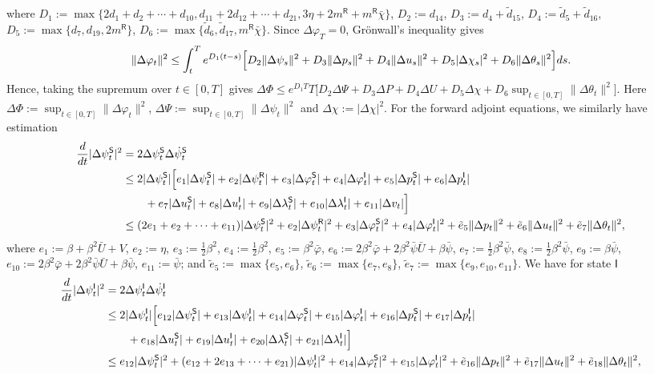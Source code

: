 \documentclass[letterpaper, 10 pt, conference]{ieeeconf}  %
\def\sS{\mathsf{S}}
\def\sI{\mathsf{I}}
\def\sR{\mathsf{R}}
\begin{document}
where $D_1:=\max\big\{
  2d_1 + d_2 + \cdots + d_{10},
  d_{11} + 2d_{12} + \cdots + d_{21},
  3\eta + 2m^{\sR} + m^{\sR}\bar{\chi}\big\}$, $D_2 := d_{14}$, $D_3:= d_4+\tilde{d}_{15}$, $D_4 := \tilde{d}_5+ \tilde{d}_{16}$, $D_5:=\max\{ d_7,d_{19},2m^{\sR}\}$, $D_6 := \max\{ \tilde{d}_6,\tilde{d}_{17},m^{\sR}\bar{\chi}\}$.
Since $\Delta \varphi_T = 0$, Gr\"onwall's inequality gives
$$
\|\Delta \varphi_t\|^2 \le \int_t^T e^{D_1(t-s)}
\Bigl[
D_2\|\Delta \psi_s\|^2 + D_3\|\Delta p_s\|^2 + D_4\|\Delta u_s\|^2 + D_5|\Delta \chi_s|^2 + D_6\|\Delta \theta_s\|^2
\Bigr] ds.
$$
Hence, taking the supremum over $t \in [0,T]$ gives $\Delta \Phi \le e^{D_1T}T\big[D_2\Delta \Psi + D_3\Delta P + D_4\Delta U + D_5\Delta \chi + D_6 \sup_{t\in[0,T]}\|\Delta \theta_t\|^2 \big]$. Here $\Delta \Phi := \sup_{t\in[0,T]}\|\Delta \varphi_t\|^2$, $\Delta \Psi := \sup_{t\in[0,T]}\|\Delta \psi_t\|^2$ and $\Delta \chi := |\Delta \chi|^2$.
For the forward adjoint equations, we similarly have estimation
$$
\begin{aligned}
\frac{d}{dt} |\Delta \psi_t^{\sS}|^2
&= 2\Delta \psi_t^{\sS}\Delta \dot \psi_t^{\sS} \\
&\le 2|\Delta \psi_t^{\sS}|
\Bigl[
e_1|\Delta \psi_t^{\sS}| + e_2|\Delta \psi_t^{\sR}| + e_3|\Delta \varphi_t^{\sS}| + e_4|\Delta \varphi_t^{\sI}| + e_5|\Delta p_t^\sS| + e_6|\Delta p_t^\sI| \\ & \quad \quad + e_7|\Delta u_t^\sS| + e_8|\Delta u_t^\sI| + e_9|\Delta \lambda^\sS_t| + e_{10}|\Delta \lambda^\sI_t| + e_{11}|\Delta v_t|
\Bigr] \\
&\leq (2e_1+e_2+\cdots+e_{11})|\Delta \psi_t^{\sS}|^2 + e_2|\Delta \psi_t^{\sR}|^2 + e_3|\Delta \varphi_t^{\sS}|^2 + e_4|\Delta \varphi_t^{\sI}|^2 + \tilde{e}_5\|\Delta p_t\|^2 + \tilde{e}_6\|\Delta u_t\|^2 + \tilde{e}_7\|\Delta \theta_t\|^2,
\end{aligned}
$$
where $e_1:=\beta + \beta^2\bar{U} + V$, $e_2 := \eta$, $e_3:=\frac{1}{2}\beta^2$, $e_4:=\frac{1}{2}\beta^2$, $e_5:=\beta^2 \bar{\varphi}$, $e_6:=2\beta^2\bar{\varphi}+2\beta^2\bar{\psi}\bar{U}+\beta \bar{\psi}$, $e_7:=\frac{1}{2}\beta^2 \bar{\psi}$, $e_8:=\frac{1}{2}\beta^2 \bar{\psi}$, $e_9:=\beta\bar{\psi}$, $e_{10}:=2\beta^2\bar{\varphi}+2\beta^2\bar{\psi}\bar{U}+\beta \bar{\psi}$, $e_{11}:=\bar{\psi}$; and $\tilde{e}_{5}:=\max\{e_5,e_6\}$, 
$\tilde{e}_{6}:=\max\{e_7,e_8\}$, $\tilde{e}_{7}:=\max\{e_9,e_{10},e_{11}\}$. We have for state $\sI$
$$
\begin{aligned}
\frac{d}{dt} |\Delta \psi_t^{\sI}|^2
&= 2\Delta \psi_t^{\sI}\Delta \dot \psi_t^{\sI} \\
&\leq 2|\Delta \psi_t^{\sI}|
\Bigl[
e_{12}|\Delta \psi_t^{\sS}| + e_{13}|\Delta \psi_t^{\sI}| + e_{14}|\Delta \varphi_t^{\sS}| + e_{15}|\Delta \varphi_t^{\sI}| + e_{16}|\Delta p_t^\sS| + e_{17}|\Delta p_t^\sI| \\ & \quad\quad + e_{18}|\Delta u_t^\sS| + e_{19}|\Delta u_t^\sI| + e_{20}|\Delta \lambda_t^\sS|+ e_{21}|\Delta \lambda_t^\sI|
\Bigr] \\
&\leq e_{12}|\Delta \psi_t^{\sS}|^2 + (e_{12}+2e_{13}+\cdots+e_{21})|\Delta \psi_t^{\sI}|^2 + e_{14}|\Delta \varphi_t^{\sS}|^2 + e_{15}|\Delta \varphi_t^{\sI}|^2 + \tilde{e}_{16}\|\Delta p_t\|^2 + \tilde{e}_{17}\|\Delta u_t\|^2 + \tilde{e}_{18}\|\Delta \theta_t\|^2,
\end{aligned}
$$
\end{document}
